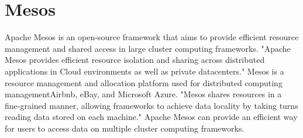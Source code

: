 \section{Mesos}

Apache Mesos is an open-source framework that aims to provide efficient
resource management and shared access in large cluster computing frameworks. 
"Apache Mesos provides efficient resource isolation and 
sharing across distributed applications in Cloud environments
as well as private datacenters." \cite{hid-sp18-407-mesos-1}
Mesos is a resource management and allocation platform used for 
distributed computing managementAirbnb, eBay, and Microsoft Azure. 
"Mesos shares resources in a fine-grained manner, allowing 
frameworks to achieve data locality by taking turns reading data 
stored on each machine." \cite{hid-sp18-407-mesos-2}
Apache Mesos can provide an efficient way for users to access 
data on multiple cluster computing frameworks. \cite{hid-sp18-407-mesos-2}
